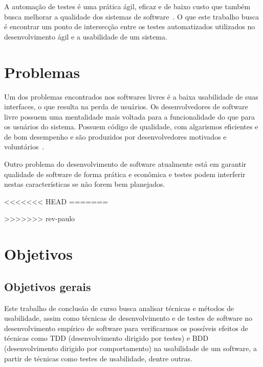 

A automação de testes é uma prática ágil, eficaz e de baixo custo que também busca melhorar a qualidade dos sistemas de software~\cite{cotter1995}. O que este trabalho busca é encontrar um ponto de intersecção entre os testes automatizados utilizados no desenvolvimento ágil e a usabilidade de um sistema.

 

\section{Problemas}

Um dos problemas encontrados nos softwares livres é a baixa usabilidade de suas interfaces, o que resulta na perda de usuários. 
%
Os desenvolvedores de software livre possuem uma mentalidade mais voltada para a funcionalidade do que para os usuários do sistema. Possuem código de qualidade, com algarismos eficientes e de bom desempenho e são produzidos por desenvolvedores motivados e voluntários~\cite{santos2012}. 

Outro problema do desenvolvimento de software atualmente está em garantir qualidade de software de forma prática e econômica e testes podem interferir nestas características se não forem bem planejados.

<<<<<<< HEAD
=======

>>>>>>> rev-paulo

\section{Objetivos}

\subsection{Objetivos gerais}
	 
Este trabalho de conclusão de curso busca analisar técnicas e métodos de usabilidade, assim como técnicas de desenvolvimento e de testes de software no desenvolvimento empírico de software para verificarmos os possíveis efeitos de técnicas como TDD (desenvolvimento dirigido por testes) e BDD (desenvolvimento dirigido por comportamento) na usabilidade de um software, a partir de técnicas como testes de usabilidade, dentre outras.
	 
